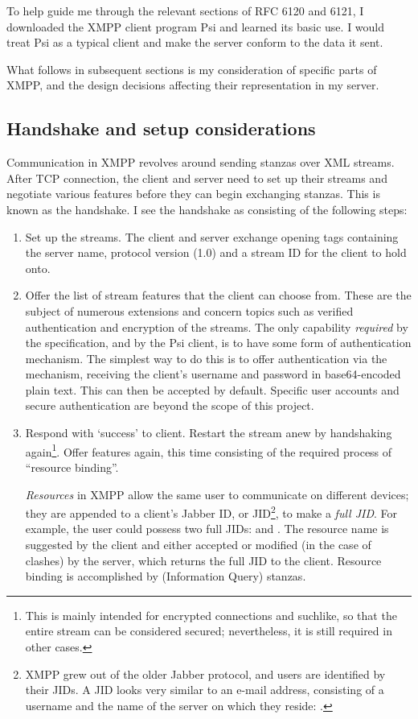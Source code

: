 \documentclass[12pt,a4paper,twoside,openright]{report}
\begin{document}
{To help guide me through the relevant sections of RFC 6120 and 6121, I downloaded the XMPP client program Psi\cite{Psi-IM} and learned its basic use. I would treat Psi as a typical client and make the server conform to the data it sent.

What follows in subsequent sections is my consideration of specific parts of XMPP, and the design decisions affecting their representation in my server.

\subsection{Handshake and setup considerations}\label{sec:prep-handshake}
Communication in XMPP revolves around sending stanzas over XML streams. After TCP connection, the client and server need to set up their streams and negotiate various features before they can begin exchanging stanzas. This is known as the handshake. I see the handshake as consisting of the following steps:
\begin{enumerate}
  \item Set up the streams. The client and server exchange  opening tags containing the server name, protocol version (1.0) and a stream ID for the client to hold onto.

  \item Offer the list of stream features that the client can choose from. These are the subject of numerous extensions and concern topics such as verified authentication and encryption of the streams. The only capability \emph{required} by the specification, and by the Psi client, is to have some form of authentication mechanism. The simplest way to do this is to offer authentication via the  mechanism, receiving the client's username and password in base64-encoded plain text. This can then be accepted by default. Specific user accounts and secure authentication are beyond the scope of this project.

  \item Respond with `success' to client. Restart the stream anew by handshaking again\footnote{This is mainly intended for encrypted connections and suchlike, so that the entire stream can be considered secured; nevertheless, it is still required in other cases.}. Offer features again, this time consisting of the required process of ``resource binding''.

  \emph{Resources} in XMPP allow the same user to communicate on different devices; they are appended to a client's Jabber ID, or JID\footnote{XMPP grew out of the older Jabber protocol, and users are identified by their JIDs. A JID looks very similar to an e-mail address, consisting of a username and the name of the server on which they reside: .}, to make a \emph{full JID}. For example, the user  could possess two full JIDs:  and . The resource name is suggested by the client and either accepted or modified (in the case of clashes) by the server, which returns the full JID to the client. Resource binding is accomplished by  (Information Query) stanzas.


\end{enumerate}}
\end{document}
